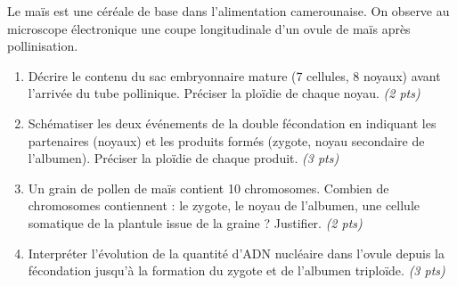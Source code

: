 \documentclass[11pt]{article}
\begin{document}
\begin{exercice}
Le maïs est une céréale de base dans l'alimentation camerounaise. On observe au microscope électronique une coupe longitudinale d'un ovule de maïs après pollinisation.
\begin{enumerate}
    \item Décrire le contenu du sac embryonnaire mature (7 cellules, 8 noyaux) avant l'arrivée du tube pollinique. Préciser la ploïdie de chaque noyau. \textit{(2 pts)}
    \item Schématiser les deux événements de la double fécondation en indiquant les partenaires (noyaux) et les produits formés (zygote, noyau secondaire de l'albumen). Préciser la ploïdie de chaque produit. \textit{(3 pts)}
    \item Un grain de pollen de maïs contient 10 chromosomes. Combien de chromosomes contiennent : le zygote, le noyau de l'albumen, une cellule somatique de la plantule issue de la graine ? Justifier. \textit{(2 pts)}
    \item Interpréter l'évolution de la quantité d'ADN nucléaire dans l'ovule depuis la fécondation jusqu'à la formation du zygote et de l'albumen triploïde. \textit{(3 pts)}
\end{enumerate}
\end{exercice}
\end{document}

